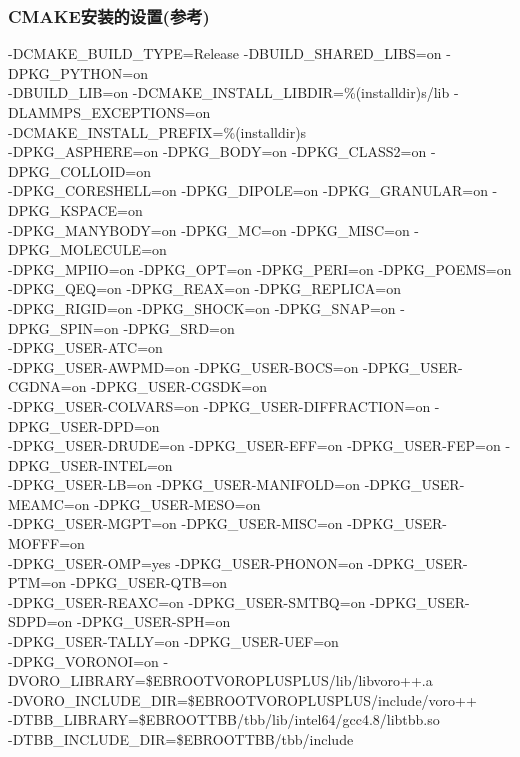 \documentclass[10pt,a4paper]{article}
\begin{document}
\subsubsection{\rm{CMAKE}安装的设置(参考)}
-DCMAKE\_BUILD\_TYPE=Release -DBUILD\_SHARED\_LIBS=on -DPKG\_PYTHON=on \\
-DBUILD\_LIB=on -DCMAKE\_INSTALL\_LIBDIR=\%(installdir)s/lib -DLAMMPS\_EXCEPTIONS=on \\
-DCMAKE\_INSTALL\_PREFIX=\%(installdir)s \\
-DPKG\_ASPHERE=on -DPKG\_BODY=on -DPKG\_CLASS2=on -DPKG\_COLLOID=on \\
-DPKG\_CORESHELL=on -DPKG\_DIPOLE=on -DPKG\_GRANULAR=on -DPKG\_KSPACE=on \\
-DPKG\_MANYBODY=on -DPKG\_MC=on -DPKG\_MISC=on -DPKG\_MOLECULE=on \\
-DPKG\_MPIIO=on -DPKG\_OPT=on -DPKG\_PERI=on -DPKG\_POEMS=on \\
-DPKG\_QEQ=on -DPKG\_REAX=on -DPKG\_REPLICA=on \\
-DPKG\_RIGID=on -DPKG\_SHOCK=on -DPKG\_SNAP=on -DPKG\_SPIN=on -DPKG\_SRD=on \\
-DPKG\_USER-ATC=on \\
-DPKG\_USER-AWPMD=on -DPKG\_USER-BOCS=on -DPKG\_USER-CGDNA=on -DPKG\_USER-CGSDK=on \\
-DPKG\_USER-COLVARS=on -DPKG\_USER-DIFFRACTION=on -DPKG\_USER-DPD=on \\
-DPKG\_USER-DRUDE=on -DPKG\_USER-EFF=on -DPKG\_USER-FEP=on -DPKG\_USER-INTEL=on \\
-DPKG\_USER-LB=on -DPKG\_USER-MANIFOLD=on -DPKG\_USER-MEAMC=on -DPKG\_USER-MESO=on \\
-DPKG\_USER-MGPT=on -DPKG\_USER-MISC=on -DPKG\_USER-MOFFF=on\\
-DPKG\_USER-OMP=yes -DPKG\_USER-PHONON=on -DPKG\_USER-PTM=on -DPKG\_USER-QTB=on \\
-DPKG\_USER-REAXC=on -DPKG\_USER-SMTBQ=on -DPKG\_USER-SDPD=on -DPKG\_USER-SPH=on \\
-DPKG\_USER-TALLY=on -DPKG\_USER-UEF=on \\
-DPKG\_VORONOI=on -DVORO\_LIBRARY=\$EBROOTVOROPLUSPLUS/lib/libvoro++.a \\
-DVORO\_INCLUDE\_DIR=\$EBROOTVOROPLUSPLUS/include/voro++ \\
-DTBB\_LIBRARY=\$EBROOTTBB/tbb/lib/intel64/gcc4.8/libtbb.so \\
-DTBB\_INCLUDE\_DIR=\$EBROOTTBB/tbb/include \\
\end{document}
